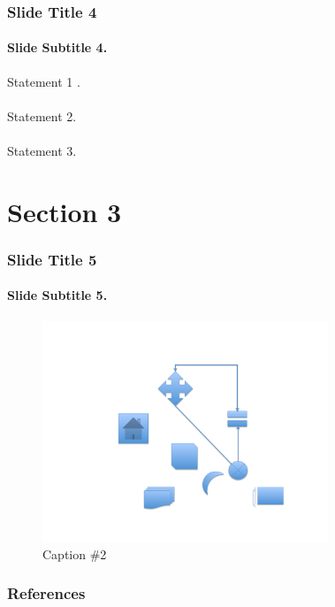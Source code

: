 \documentclass[xcolor={usenames,dvipsnames},hyperref={hyperindex,bookmarks}]{beamer}
\begin{document}
\begin{frame}
	\frametitle{Slide Title 4}
	\framesubtitle{Slide Subtitle 4.}
	
	Statement 1 \cite{vanDongen2012}. \\
	\ \\
	Statement 2. \\
	\ \\
	Statement 3.
\end{frame}

\section{Section 3}

\begin{frame}
	\frametitle{Slide Title 5}
	\framesubtitle{Slide Subtitle 5.}
	
	\begin{figure}
		\centering
		\includegraphics[height=2.6in]{./pics/my_figure}
		\caption{Caption \#2}
	\end{figure}
\end{frame}




{\linespread{1}
\begin{frame}
	\frametitle{References}
	
	
\end{frame}
}
\end{document}
